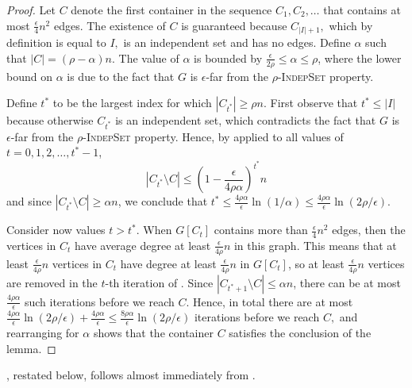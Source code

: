 \documentclass[11pt]{article}
\begin{document}
\begin{proof}
Let $C$ denote the first container in the sequence $C_1,C_2,\ldots$ that contains at most $\frac\epsilon4 n^2$ edges.
The existence of $C$ is guaranteed because $C_{|I|+1},$ which by definition is equal to $I,$ is an independent set and has no edges.
Define $\alpha$ such that $|C| = (\rho - \alpha) n$. The value of $\alpha$ is bounded by $\frac{\epsilon}{2\rho} \le \alpha \le \rho$, where the lower bound on $\alpha$ is due to the fact that $G$ is $\epsilon$-far from the \textsc{$\rho$-IndepSet} property.

Define $t^*$ to be the largest index for which $|C_{t^*}| \ge \rho n$.
First observe that $t^* \leq |I|$ because otherwise $C_{t^*}$ is an independent set, which contradicts the fact that $G$ is $\epsilon$-far from the \textsc{$\rho$-IndepSet} property.
Hence, by  applied to all values of $t = 0,1,2, \ldots, t^*-1$,  
\[
|C_{t^*} \setminus C| \le \left(1 - \frac{\epsilon}{4\rho \alpha}\right)^{t^*}n
\]
and since $|C_{t^*} \setminus C| \ge \alpha n$, we conclude that $t^* \le \frac{4\rho \alpha}{\epsilon} \ln(1/\alpha) \le \frac{4\rho \alpha}{\epsilon} \ln (2\rho/\epsilon)$.

Consider now values $t > t^*$.
When $G[C_t]$ contains more than $\frac{\epsilon}{4} n^2$ edges, then the vertices in $C_t$ have average degree at least $\frac{\epsilon}{4\rho} n$ in this graph. 
This means that at least $\frac{\epsilon}{4\rho}n$ vertices in $C_t$ have degree at least $\frac{\epsilon}{4\rho} n$ in $G[C_t]$, so at least $\frac{\epsilon}{4\rho}n$ vertices are removed in the $t$-th iteration of . 
Since $|C_{t^*+1} \setminus C| \le \alpha n$, there can be at most $\frac{4\rho \alpha}{\epsilon}$ such iterations before we reach $C.$
Hence, in total there are at most $\frac{4\rho \alpha}{\epsilon} \ln(2\rho/\epsilon)  + \frac{4\rho \alpha}{\epsilon} \le \frac{8\rho \alpha}{\epsilon} \ln (2\rho/\epsilon)$ iterations before we reach $C,$ and rearranging for $\alpha$ shows that the container $C$ satisfies the conclusion of the lemma. 
\end{proof}

, restated below, follows almost immediately from .

\GCLindepsetNew*
\end{document}
